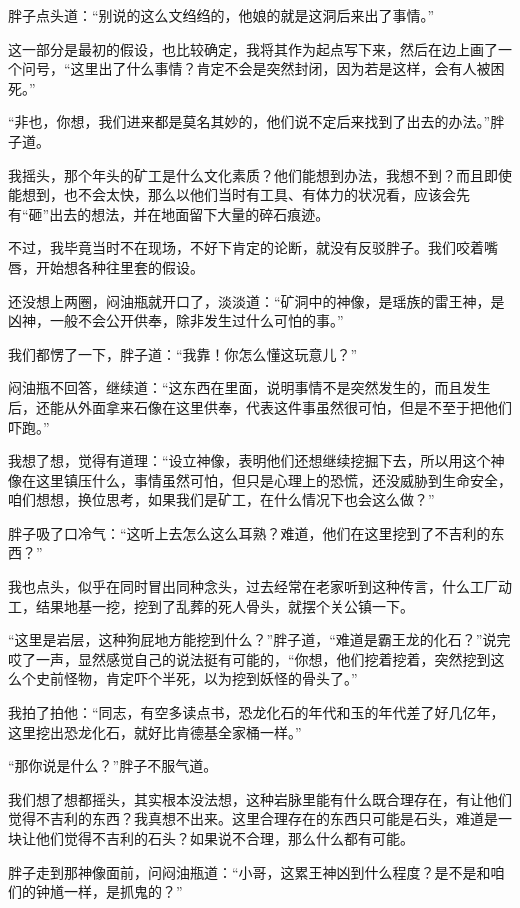 胖子点头道：“别说的这么文绉绉的，他娘的就是这洞后来出了事情。”

这一部分是最初的假设，也比较确定，我将其作为起点写下来，然后在边上画了一个问号，“这里出了什么事情？肯定不会是突然封闭，因为若是这样，会有人被困死。”

“非也，你想，我们进来都是莫名其妙的，他们说不定后来找到了出去的办法。”胖子道。

我摇头，那个年头的矿工是什么文化素质？他们能想到办法，我想不到？而且即使能想到，也不会太快，那么以他们当时有工具、有体力的状况看，应该会先有“砸”出去的想法，并在地面留下大量的碎石痕迹。

不过，我毕竟当时不在现场，不好下肯定的论断，就没有反驳胖子。我们咬着嘴唇，开始想各种往里套的假设。

还没想上两圈，闷油瓶就开口了，淡淡道：“矿洞中的神像，是瑶族的雷王神，是凶神，一般不会公开供奉，除非发生过什么可怕的事。”

我们都愣了一下，胖子道：“我靠！你怎么懂这玩意儿？”

闷油瓶不回答，继续道：“这东西在里面，说明事情不是突然发生的，而且发生后，还能从外面拿来石像在这里供奉，代表这件事虽然很可怕，但是不至于把他们吓跑。”

我想了想，觉得有道理：“设立神像，表明他们还想继续挖掘下去，所以用这个神像在这里镇压什么，事情虽然可怕，但只是心理上的恐慌，还没威胁到生命安全，咱们想想，换位思考，如果我们是矿工，在什么情况下也会这么做？”

胖子吸了口冷气：“这听上去怎么这么耳熟？难道，他们在这里挖到了不吉利的东西？”

我也点头，似乎在同时冒出同种念头，过去经常在老家听到这种传言，什么工厂动工，结果地基一挖，挖到了乱葬的死人骨头，就摆个关公镇一下。

“这里是岩层，这种狗屁地方能挖到什么？”胖子道，“难道是霸王龙的化石？”说完哎了一声，显然感觉自己的说法挺有可能的，“你想，他们挖着挖着，突然挖到这么个史前怪物，肯定吓个半死，以为挖到妖怪的骨头了。”

我拍了拍他：“同志，有空多读点书，恐龙化石的年代和玉的年代差了好几亿年，这里挖出恐龙化石，就好比肯德基全家桶一样。”

“那你说是什么？”胖子不服气道。

我们想了想都摇头，其实根本没法想，这种岩脉里能有什么既合理存在，有让他们觉得不吉利的东西？我真想不出来。这里合理存在的东西只可能是石头，难道是一块让他们觉得不吉利的石头？如果说不合理，那么什么都有可能。

胖子走到那神像面前，问闷油瓶道：“小哥，这累王神凶到什么程度？是不是和咱们的钟馗一样，是抓鬼的？”

